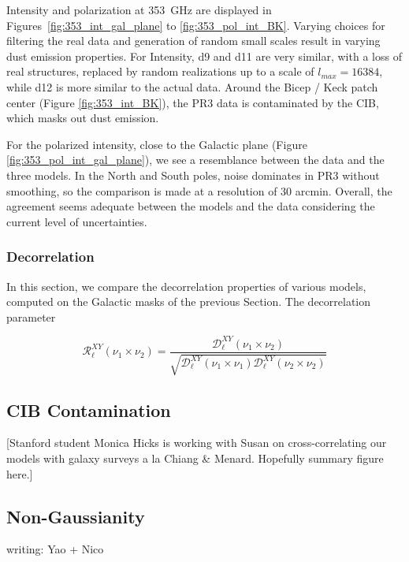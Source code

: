 \documentclass[twocolumn]{aastex631}
\begin{document}
Intensity and polarization at 353~GHz are displayed in Figures~\ref{fig:353_int_gal_plane} to \ref{fig:353_pol_int_BK}. Varying choices for filtering the real data and generation of random small scales result in varying dust emission properties. For Intensity, d9 and d11 are very similar, with a loss of real structures, replaced by random realizations up to a scale of $l_{max} = 16384$, while d12 is more similar to the actual data. 
Around the Bicep / Keck patch center (Figure \ref{fig:353_int_BK}), the PR3 data is contaminated by the CIB, which masks out dust emission. 

For the polarized intensity, close to the Galactic plane (Figure \ref{fig:353_pol_int_gal_plane}), we see a resemblance between the data and the three models. In the North and South poles, noise dominates in PR3 without smoothing, so the comparison is made at a resolution of 30 arcmin. Overall, the agreement seems adequate between the models and the data considering the current level of uncertainties. 


\subsubsection{Decorrelation} \label{sec:decorrelation}

In this section, we compare the decorrelation properties of various models, computed on the Galactic masks of the previous Section. The decorrelation parameter

\begin{equation}
    \mathcal{R}^{XY}_\ell(\nu_1\times\nu_2) = \frac{\mathcal{D}_\ell^{XY}(\nu_1\times\nu_2)}{\sqrt{\mathcal{D}_\ell^{XY}(\nu_1\times\nu_1)\mathcal{D}_\ell^{XY}(\nu_2\times\nu_2)}}
\end{equation}

\subsection{CIB Contamination} \label{sec:CIBcontamination}

[Stanford student Monica Hicks is working with Susan on cross-correlating our models with galaxy surveys a la Chiang \& Menard. Hopefully summary figure here.] 

\subsection{Non-Gaussianity} \label{sec:nongaussianity}
writing: Yao + Nico
\end{document}
